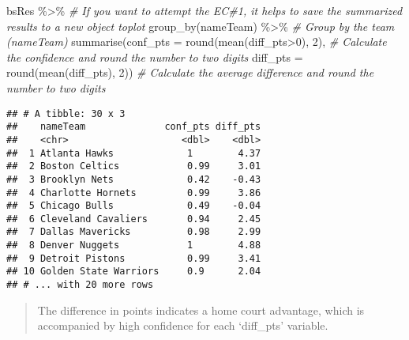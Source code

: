 \documentclass[
]{article}
\newenvironment{Shaded}{\begin{snugshade}}{\end{snugshade}}
\newcommand{\AttributeTok}[1]{\textcolor[rgb]{0.77,0.63,0.00}{#1}}
\newcommand{\CommentTok}[1]{\textcolor[rgb]{0.56,0.35,0.01}{\textit{#1}}}
\newcommand{\DecValTok}[1]{\textcolor[rgb]{0.00,0.00,0.81}{#1}}
\newcommand{\FunctionTok}[1]{\textcolor[rgb]{0.00,0.00,0.00}{#1}}
\newcommand{\NormalTok}[1]{#1}
\newcommand{\SpecialCharTok}[1]{\textcolor[rgb]{0.00,0.00,0.00}{#1}}
\begin{document}
\begin{Shaded}
\begin{Highlighting}[]
\NormalTok{bsRes }\SpecialCharTok{\%\textgreater{}\%} \CommentTok{\# If you want to attempt the EC\#1, it helps to save the summarized results to a new object \textquotesingle{}toplot\textquotesingle{}}
  \FunctionTok{group\_by}\NormalTok{(nameTeam) }\SpecialCharTok{\%\textgreater{}\%} \CommentTok{\# Group by the team (nameTeam)}
  \FunctionTok{summarise}\NormalTok{(}\AttributeTok{conf\_pts =} \FunctionTok{round}\NormalTok{(}\FunctionTok{mean}\NormalTok{(diff\_pts}\SpecialCharTok{\textgreater{}}\DecValTok{0}\NormalTok{), }\DecValTok{2}\NormalTok{), }\CommentTok{\# Calculate the confidence and round the number to two digits}
            \AttributeTok{diff\_pts =} \FunctionTok{round}\NormalTok{(}\FunctionTok{mean}\NormalTok{(diff\_pts), }\DecValTok{2}\NormalTok{)) }\CommentTok{\# Calculate the average difference and round the number to two digits}
\end{Highlighting}
\end{Shaded}

\begin{verbatim}
## # A tibble: 30 x 3
##    nameTeam              conf_pts diff_pts
##    <chr>                    <dbl>    <dbl>
##  1 Atlanta Hawks             1        4.37
##  2 Boston Celtics            0.99     3.01
##  3 Brooklyn Nets             0.42    -0.43
##  4 Charlotte Hornets         0.99     3.86
##  5 Chicago Bulls             0.49    -0.04
##  6 Cleveland Cavaliers       0.94     2.45
##  7 Dallas Mavericks          0.98     2.99
##  8 Denver Nuggets            1        4.88
##  9 Detroit Pistons           0.99     3.41
## 10 Golden State Warriors     0.9      2.04
## # ... with 20 more rows
\end{verbatim}

\begin{quote}
The difference in points indicates a home court advantage, which is
accompanied by high confidence for each `diff\_pts' variable.
\end{quote}
\end{document}
